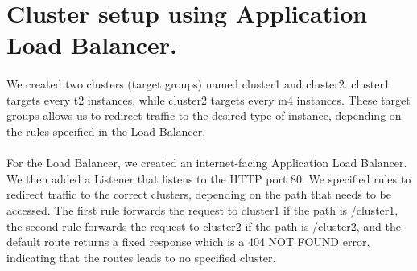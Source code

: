 \section{Cluster setup using Application Load Balancer.} \label{T2}

\paragraph{}We created two clusters (target groups) named cluster1 and cluster2. cluster1 targets every t2 instances, while cluster2 targets every m4 instances. These target groups allows us to redirect traffic to the desired type of instance, depending on the rules specified in the Load Balancer.
\paragraph{}For the Load Balancer, we created an internet-facing Application Load Balancer. We then added a Listener that listens to the HTTP port 80. We specified rules to redirect traffic to the correct clusters, depending on the path that needs to be accessed. The first rule forwards the request to cluster1 if the path is /cluster1, the second rule forwards the request to cluster2 if the path is /cluster2, and the default route returns a fixed response which is a 404 NOT FOUND error, indicating that the routes leads to no specified cluster.

